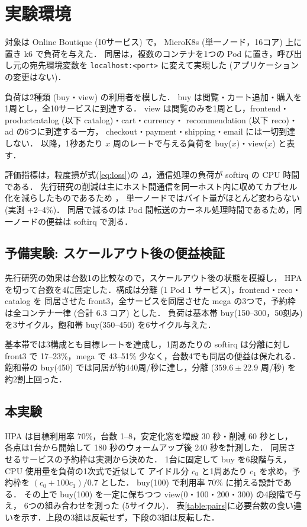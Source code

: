 \documentclass[T,J]{fose}
\begin{document}
\section{実験環境}

対象は Online Boutique\cite{onlineboutique} (10サービス) で，
MicroK8s (単一ノード，16コア) 上に置き k6 で負荷を与えた．
同居は，複数のコンテナを1つの Pod に置き，呼び出し元の宛先環境変数を
\texttt{localhost:<port>} に変えて実現した (アプリケーションの変更はない)．

負荷は2種類 (buy・view) の利用者を模した．
buy は閲覧・カート追加・購入を1周とし，全10サービスに到達する．
view は閲覧のみを1周とし，frontend・productcatalog (以下 catalog)・cart・currency・
recommendation (以下 reco)・ad の6つに到達する一方，
checkout・payment・shipping・email には一切到達しない．
以降，1秒あたり $x$ 周のレートで与える負荷を buy($x$)・view($x$) と表す．

評価指標は，粒度損が式(\ref{eq:loss})の $\Delta$，通信処理の負荷が softirq の CPU 時間である．
先行研究の削減は主にホスト間通信を同一ホスト内に収めてカプセル化を減らしたものであるため
\cite{wickramanayaka2022}，
単一ノードではバイト量がほとんど変わらない (実測 +2--4\%)．
同居で減るのは Pod 間転送のカーネル処理時間であるため，同一ノードの便益は softirq で測る．


\subsection{予備実験: スケールアウト後の便益検証}

先行研究\cite{wickramanayaka2022}の効果は台数1の比較なので，スケールアウト後の状態を模擬し，
HPA を切って台数を4に固定した．構成は分離 (1 Pod 1 サービス)，frontend・reco・catalog を
同居させた front3，全サービスを同居させた mega の3つで，予約枠は全コンテナ一律 (合計 6.3 コア) とした．
負荷は基本帯 buy(150--300，50刻み) を3サイクル，飽和帯 buy(350--450) を6サイクル与えた．

基本帯では3構成とも目標レートを達成し，1周あたりの softirq は分離に対し
front3 で 17--23\%，mega で 43--51\% 少なく，台数4でも同居の便益は保たれる．
飽和帯の buy(450) では同居が約440周/秒に達し，分離 ($359.6 \pm 22.9$ 周/秒) を約2割上回った．


\subsection{本実験}\label{sec:main}

HPA は目標利用率 70\%，台数 1--8，安定化窓を増設 30 秒・削減 60 秒とし，
各点は1台から開始して 180 秒のウォームアップ後 240 秒を計測した．
同居させるサービスの予約枠は実測から決めた．
1台に固定して buy を6段階与え，CPU 使用量を負荷の1次式で近似して
アイドル分 $c_{0}$ と1周あたり $c_{1}$ を求め，予約枠を $(c_{0} + 100 c_{1}) / 0.7$ とした．
buy(100) で利用率 70\% に揃える設計である．
その上で buy(100) を一定に保ちつつ view(0・100・200・300) の4段階で与え，
6つの組み合わせを測った (5サイクル)．
表\ref{table:pairs}に必要台数の食い違いを示す．上段の3組は反転せず，下段の3組は反転した．
\end{document}
